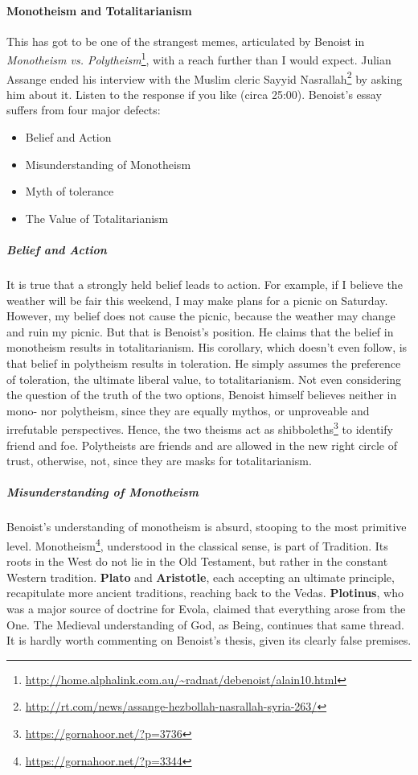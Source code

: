 \paragraph{Monotheism and Totalitarianism}


This has got to be one of the strangest memes, articulated by Benoist in \textit{Monotheism vs. Polytheism}\footnote{\url{http://home.alphalink.com.au/~radnat/debenoist/alain10.html}}, with a reach further than I would expect. Julian Assange ended his interview with the Muslim cleric Sayyid Nasrallah\footnote{\url{http://rt.com/news/assange-hezbollah-nasrallah-syria-263/}} by asking him about it. Listen to the response if you like (circa 25:00). Benoist's essay suffers from four major defects:

\begin{itemize}


\item Belief and Action

\item Misunderstanding of Monotheism

\item Myth of tolerance

\item The Value of Totalitarianism
\end{itemize}

\subparagraph{Belief and Action}


It is true that a strongly held belief leads to action. For example, if I believe the weather will be fair this weekend, I may make plans for a picnic on Saturday. However, my belief does not cause the picnic, because the weather may change and ruin my picnic. But that is Benoist's position. He claims that the belief in monotheism results in totalitarianism. His corollary, which doesn't even follow, is that belief in polytheism results in toleration. He simply assumes the preference of toleration, the ultimate liberal value, to totalitarianism. Not even considering the question of the truth of the two options, Benoist himself believes neither in mono- nor polytheism, since they are equally mythos, or unproveable and irrefutable perspectives. Hence, the two theisms act as shibboleths\footnote{\url{https://gornahoor.net/?p=3736}} to identify friend and foe. Polytheists are friends and are allowed in the new right circle of trust, otherwise, not, since they are masks for totalitarianism.

\subparagraph{Misunderstanding of Monotheism}

Benoist's understanding of monotheism is absurd, stooping to the most primitive level. Monotheism\footnote{\url{https://gornahoor.net/?p=3344}}, understood in the classical sense, is part of Tradition. Its roots in the West do not lie in the Old Testament, but rather in the constant Western tradition. \textbf{Plato} and \textbf{Aristotle}, each accepting an ultimate principle, recapitulate more ancient traditions, reaching back to the Vedas. \textbf{Plotinus}, who was a major source of doctrine for Evola, claimed that everything arose from the One. The Medieval understanding of God, as Being, continues that same thread. It is hardly worth commenting on Benoist's thesis, given its clearly false premises.

